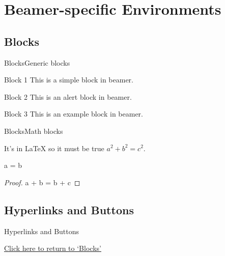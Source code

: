 \documentclass{beamer}
\begin{document}
\section{Beamer-specific Environments}

\subsection{Blocks}

\label{Blocks}
\begin{frame}{Blocks}{Generic blocks}

\begin{block}{Block 1}
This is a simple block in beamer.
\end{block}

\begin{alertblock}{Block 2}
This is an alert block in beamer.
\end{alertblock}

\begin{exampleblock}{Block 3}
This is an example block in beamer.
\end{exampleblock}

\end{frame}


\begin{frame}{Blocks}{Math blocks}

\begin{theorem}
    It's in \LaTeX{} so it must be true $ a^2 + b^2 = c^2$.
\end{theorem}
\begin{corollary}
    a = b
\end{corollary}
\begin{proof}
    a + b = b + c
\end{proof}

\end{frame}

\subsection{Hyperlinks and Buttons}

\begin{frame}{Hyperlinks and Buttons}

    \hyperlink{Blocks}{Click here to return to `Blocks'}

    \hyperlink{Outline}{}

\end{frame}
\end{document}
